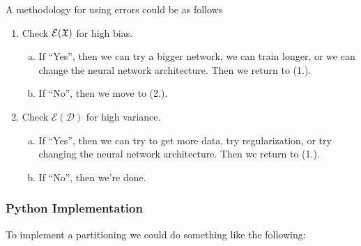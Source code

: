 A methodology for using errors could be as follows
\begin{enumerate}[1.]
	\item Check $\mathcal{E}(\frak{X})$ for high bias.
		\begin{enumerate}[a.]
			\item If ``Yes'', then we can try a bigger network, we can train longer, or we can change the neural network architecture. Then we return to (1.).
			\item If ``No'', then we move to (2.).
		\end{enumerate}
	\item Check $\mathcal{E}(\mathcal{D})$ for high variance.
		\begin{enumerate}[a.]
			\item If ``Yes'', then we can try to get more data, try regularization, or try changing the neural network architecture.  Then we return to (1.).
			\item If ``No'', then we're done.
		\end{enumerate}
\end{enumerate}


\subsubsection{Python Implementation}

To implement a partitioning we could do something like the following:



